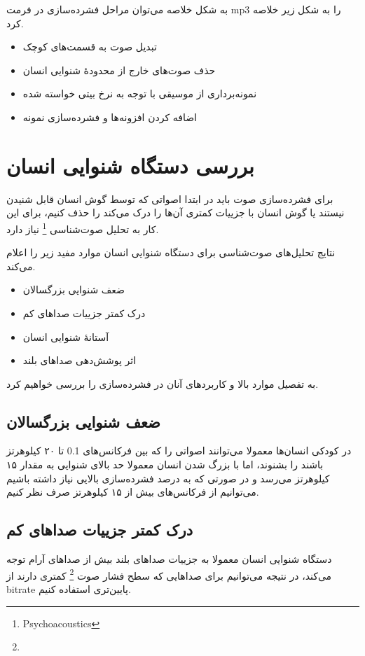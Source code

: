  به شکل خلاصه می‌توان مراحل فشرده‌سازی در فرمت mp3 
 را به شکل زیر خلاصه کرد.

 \begin{itemize}
         \item تبدیل صوت به قسمت‌های کوچک
         \item حذف صوت‌های خارج از محدودهٔ شنوایی انسان
         \item نمونه‌برداری از موسیقی با توجه به نرخ بیتی خواسته شده
         \item اضافه کردن افزونه‌ها و فشرده‌سازی نمونه
 \end{itemize}

\section{بررسی دستگاه شنوایی انسان}
برای فشرده‌سازی صوت باید در ابتدا اصواتی که توسط گوش انسان قابل شنیدن نیستند یا گوش انسان با جزییات کمتری آن‌ها را درک می‌کند را حذف کنیم، برای 
این کار به تحلیل صوت‌شناسی
\footnote{Psychoacoustics}
نیاز دارد. 

نتایج تحلیل‌های صوت‌شناسی برای دستگاه شنوایی انسان موارد مفید زیر را اعلام می‌کند. 

\begin{itemize}
        \item ضعف شنوایی بزرگسالان
        \item درک کمتر جزییات صداهای کم
        \item آستانهٔ شنوایی انسان
        \item اثر پوشش‌دهی صداهای بلند
\end{itemize}

به تفصیل موارد بالا و کاربرد‌های آنان در فشرده‌سازی را بررسی خواهیم کرد.

\subsection{ضعف شنوایی بزرگسالان}
در کودکی انسان‌ها معمولا می‌توانند اصواتی را که بین فرکانس‌های 0.1 تا ۲۰ کیلوهرتز باشند را بشنوند، اما با بزرگ شدن انسان معمولا حد بالای شنوایی 
به مقدار ۱۵ کیلوهرتز می‌رسد و در صورتی که به درصد فشرده‌سازی بالایی نیاز داشته باشیم می‌توانیم از فرکانس‌های بیش از ۱۵ کیلوهرتز صرف نظر کنیم.

\subsection{درک کمتر جزییات صداهای کم}
دستگاه شنوایی انسان معمولا به جزییات صداهای بلند بیش از صداهای آرام توجه می‌کند، در نتیجه می‌توانیم برای صداهایی که 
سطح فشار صوت \footnote{}
 کمتری دارند از bitrate پایین‌تری استفاده کنیم. 

